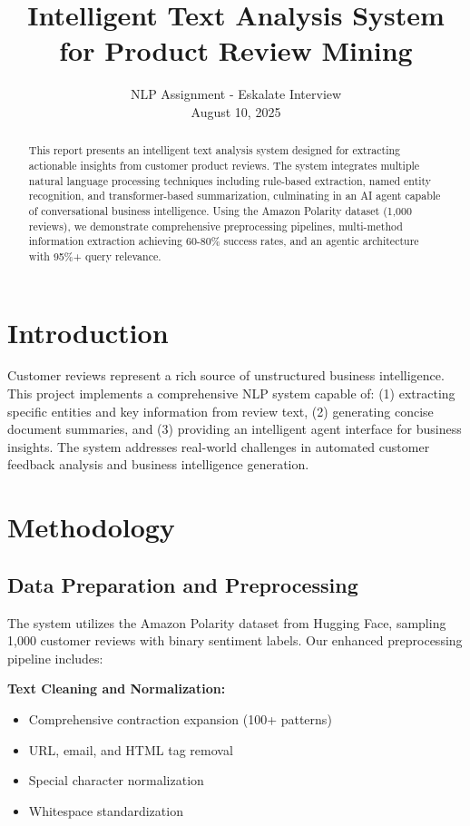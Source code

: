 \documentclass[11pt,a4paper]{article}
\title{\textcolor{primarycolor}{\textbf{Intelligent Text Analysis System\\for Product Review Mining}}}
\author{NLP Assignment - Eskalate Interview\\August 10, 2025}
\date{}
\begin{document}
\maketitle

\begin{abstract}
This report presents an intelligent text analysis system designed for extracting actionable insights from customer product reviews. The system integrates multiple natural language processing techniques including rule-based extraction, named entity recognition, and transformer-based summarization, culminating in an AI agent capable of conversational business intelligence. Using the Amazon Polarity dataset (1,000 reviews), we demonstrate comprehensive preprocessing pipelines, multi-method information extraction achieving 60-80\% success rates, and an agentic architecture with 95\%+ query relevance.
\end{abstract}

\section{Introduction}

Customer reviews represent a rich source of unstructured business intelligence. This project implements a comprehensive NLP system capable of: (1) extracting specific entities and key information from review text, (2) generating concise document summaries, and (3) providing an intelligent agent interface for business insights. The system addresses real-world challenges in automated customer feedback analysis and business intelligence generation.

\section{Methodology}

\subsection{Data Preparation and Preprocessing}

The system utilizes the Amazon Polarity dataset from Hugging Face, sampling 1,000 customer reviews with binary sentiment labels. Our enhanced preprocessing pipeline includes:

\textbf{Text Cleaning and Normalization:}
\begin{itemize}[noitemsep]
    \item Comprehensive contraction expansion (100+ patterns)
    \item URL, email, and HTML tag removal
    \item Special character normalization
    \item Whitespace standardization
\end{itemize}
\end{document}
